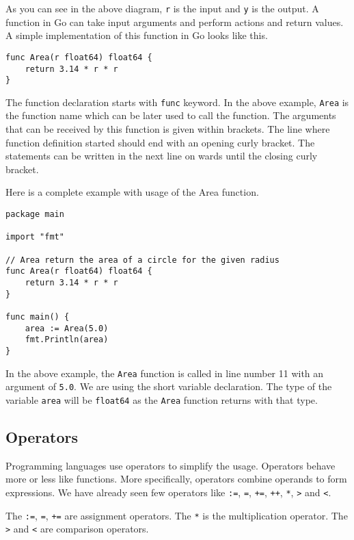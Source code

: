 As you can see in the above diagram, \texttt{r} is the input
and \texttt{y} is the output.  A function in Go can take input
arguments and perform actions and return values.  A simple
implementation of this function in Go looks like this.

\begin{lstlisting}[numbers=none]
func Area(r float64) float64 {
    return 3.14 * r * r
}
\end{lstlisting}

The function declaration starts with \texttt{func} keyword.  In the
above example, \texttt{Area} is the function name which can be later
used to call the function.  The arguments that can be received by this
function is given within brackets.  The line where function definition
started should end with an opening curly bracket.  The statements can
be written in the next line on wards until the closing curly bracket.

Here is a complete example with usage of the Area function.

\begin{lstlisting}[caption=Function usage]
package main

import "fmt"

// Area return the area of a circle for the given radius
func Area(r float64) float64 {
    return 3.14 * r * r
}

func main() {
    area := Area(5.0)
    fmt.Println(area)
}
\end{lstlisting}

In the above example, the \texttt{Area} function is called in line
number 11 with an argument of \texttt{5.0}.  We are using the short
variable declaration.  The type of the variable \texttt{area} will be
\texttt{float64} as the \texttt{Area} function returns with that type.

\subsection{Operators}

Programming languages use operators to simplify the
usage.  Operators behave more or less like functions.  More
specifically, operators combine operands to form expressions.  We have
already seen few operators
like \texttt{:=}, \texttt{=}, \texttt{+=}, \texttt{++}, \texttt{*},
\texttt{>} and \texttt{<}.

The \texttt{:=}, \texttt{=}, \texttt{+=} are assignment operators.
The \texttt{*} is the multiplication operator.  The \texttt{>}
and \texttt{<} are comparison operators.

